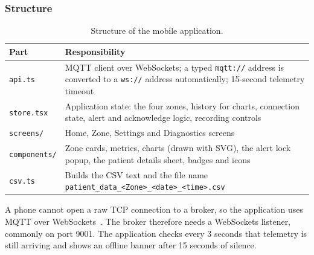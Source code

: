 \subsubsection{Structure}
{\small{}
\begin{table}[H]
\centering
\begin{tabularx}{\textwidth}{@{}>{\raggedright\arraybackslash}p{3.2cm}X@{}}
\toprule
\textbf{Part} & \textbf{Responsibility}\\
\midrule
\texttt{api.ts} & MQTT client over WebSockets; a typed \texttt{mqtt://} address is converted to a \texttt{ws://} address automatically; 15-second telemetry timeout\\
\texttt{store.tsx} & Application state: the four zones, history for charts, connection state, alert and acknowledge logic, recording controls\\
\texttt{screens/} & Home, Zone, Settings and Diagnostics screens\\
\texttt{components/} & Zone cards, metrics, charts (drawn with SVG), the alert lock popup, the patient details sheet, badges and icons\\
\texttt{csv.ts} & Builds the CSV text and the file name \texttt{patient\_data\_<Zone>\_<date>\_<time>.csv}\\
\bottomrule
\end{tabularx}
\caption{Structure of the mobile application.}
\end{table}}
A phone cannot open a raw TCP connection to a broker, so the application uses MQTT over WebSockets~\cite{mqttjs}. The broker therefore needs a WebSockets listener, commonly on port 9001. The application checks every 3 seconds that telemetry is still arriving and shows an offline banner after 15 seconds of silence.

